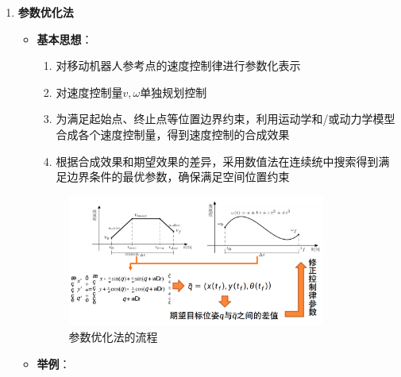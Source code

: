 \documentclass[../main.tex]{subfiles}
\begin{document}
\begin{enumerate}
\begin{itemize}
\begin{enumerate}
\begin{itemize}
                            \\\small{}
                        \end{itemize}
                    \end{enumerate}
                \end{itemize}
                    \item \textbf{参数优化法}
                        \begin{itemize}
                            \item \textbf{基本思想}：
                                \begin{enumerate}
                                    \item 对移动机器人参考点的速度控制律进行参数化表示
                                    \item 对速度控制量$v,\omega$单独规划控制
                                    \item 为满足起始点、终止点等位置边界约束，利用运动学和/或动力学模型合成各个速度控制量，得到速度控制的合成效果
                                    \item 根据合成效果和期望效果的差异，采用数值法在连续统中搜索得到满足边界条件的最优参数，确保满足空间位置约束
                                \end{enumerate}
                            \begin{figure}[H]
                                \centering
                                \includegraphics[width=0.85\textwidth]{images/canshuyouhuafa.png}
                                \caption{参数优化法的流程}
                            \end{figure} 
                            \item  \textbf{举例}：
                            \small{}
\end{itemize}
\end{enumerate}
\end{document}
